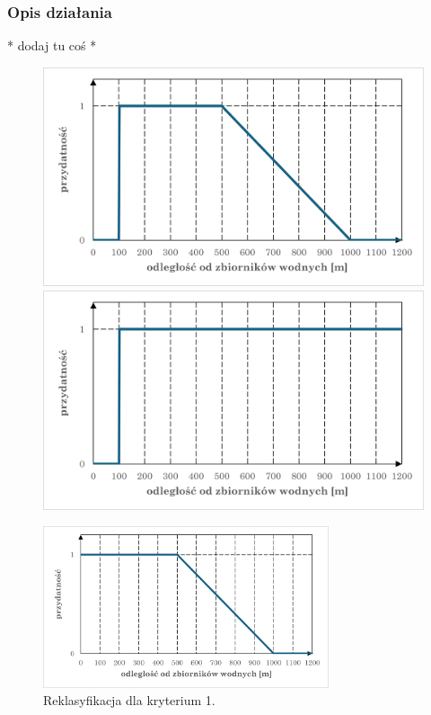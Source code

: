 \documentclass{article}
\begin{document}
\subsubsection{Opis działania}
* dodaj tu coś *
\begin{figure}[H]
    \centering
    \begin{minipage}{0.48\textwidth}
        \centering
        \includegraphics[width=\linewidth]{img/kryterium1-wykres-pierwszy.png}
        \caption*{}
    \end{minipage}
    \begin{minipage}{0.48\textwidth}
        \centering
        \includegraphics[width=\linewidth]{img/kryterium1-wykres-drugi.png}
        \caption*{}
    \end{minipage}
\end{figure}
\begin{figure}[H]
    \centering
    \includegraphics[width=0.75\textwidth]{img/kryterium1-wykres-glowny.png}
    \caption*{Reklasyfikacja dla kryterium 1.}
\end{figure}
\end{document}
